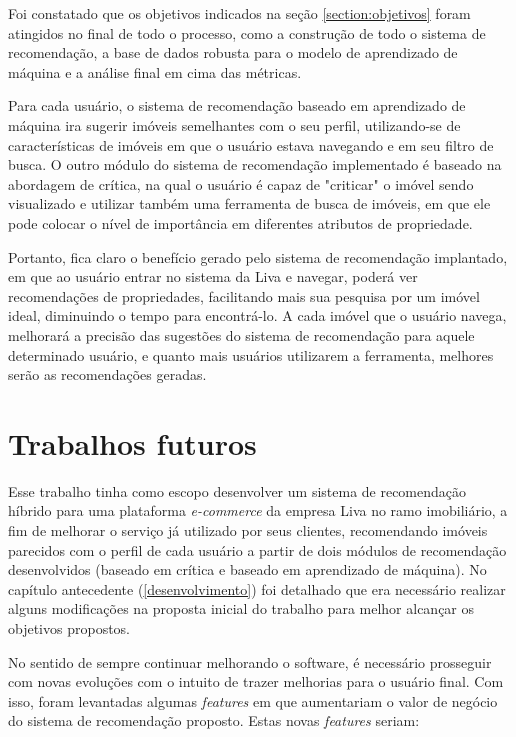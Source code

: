 Foi constatado que os objetivos indicados na seção \ref{section:objetivos} foram atingidos no final de todo o processo, como a construção de todo o sistema de recomendação, a base de dados robusta para o modelo de aprendizado de máquina e a análise final em cima das métricas.

Para cada usuário, o sistema de recomendação baseado em aprendizado de máquina ira sugerir imóveis semelhantes com o seu perfil, utilizando-se de características de imóveis em que o usuário estava navegando e em seu filtro de busca. O outro módulo do sistema de recomendação implementado é baseado na abordagem de crítica, na qual o usuário é capaz de "criticar" o imóvel sendo visualizado e utilizar também uma ferramenta de busca de imóveis, em que ele pode colocar o nível de importância em diferentes atributos de propriedade.

Portanto, fica claro o benefício gerado pelo sistema de recomendação implantado, em que ao usuário entrar no sistema da Liva e navegar, poderá ver recomendações de propriedades, facilitando mais sua pesquisa por um imóvel ideal, diminuindo o tempo para encontrá-lo. A cada imóvel que o usuário navega, melhorará a precisão das sugestões do sistema de recomendação para aquele determinado usuário, e quanto mais usuários utilizarem a ferramenta, melhores serão as recomendações geradas.

\section{Trabalhos futuros}

Esse trabalho tinha como escopo desenvolver um sistema de recomendação híbrido para uma plataforma \textit{e-commerce} da empresa Liva no ramo imobiliário, a fim de melhorar o serviço já utilizado por seus clientes, recomendando imóveis parecidos com o perfil de cada usuário a partir de dois módulos de recomendação desenvolvidos (baseado em crítica e baseado em aprendizado de máquina). No capítulo antecedente (\ref{desenvolvimento}) foi detalhado que era necessário realizar alguns modificações na proposta inicial do trabalho para melhor alcançar os objetivos propostos.

No sentido de sempre continuar melhorando o software, é necessário prosseguir com novas evoluções com o intuito de trazer melhorias para o usuário final. Com isso, foram levantadas algumas \textit{features} em que aumentariam o valor de negócio do sistema de recomendação proposto. Estas novas \textit{features} seriam:


